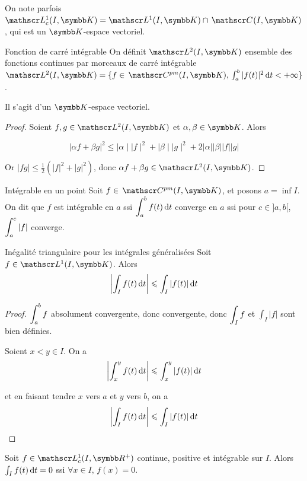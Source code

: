 \begin{remarque}
    On note parfois $\mathscr L^1_c(I, \K) = \mathscr L^1(I, \K) \cap \mc {} (I, \K)$, 
    qui est un $\K$-espace vectoriel.
\end{remarque}

\begin{definition}{Fonction de carré intégrable}{}
    On définit $\mathscr L^2(I, \K)$ ensemble des fonctions continues par morceaux de carré 
    intégrable $\mathscr L^2(I, \K) = \{f \in \mc {pm}(I, \K), \, \int_a^b |f(t)|^2 \dt < + \infty\}$.

    Il s'agit d'un $\K$-espace vectoriel.
\end{definition}

\begin{proof}
    Soient $f, g \in \mathscr L^2(I, \K)$ et $\alpha, \beta \in \K$. Alors

    $$|\alpha f + \beta g|^2 \leqslant \mid \alpha \mid \mid f \mid ^2 + \mid \beta \mid \mid g \mid^2 + 2 |\alpha| |\beta| |f| |g| $$

    Or $|fg| \leqslant \frac 1 2 (|f|^2 + |g|^2)$, donc $\alpha f + \beta g \in \mathscr L^2(I, \K)$.
\end{proof}

\begin{definition}{Intégrable en un point}{}
    Soit $f \in \mc {pm}(I, \K)$, et posons $a = \inf I$. On dit que $f$ est intégrable en 
    $a$ ssi $\displaystyle \int_a^b f(t) \,\mathrm{d}t$ converge en $a$ ssi pour $c \in ]a, b[$, $\displaystyle \int_a^c |f|$ converge.
\end{definition}

\begin{theoreme}{Inégalité triangulaire pour les intégrales généralisées}{}
    Soit $f \in \mathscr L^1(I, \K)$. Alors 
    $$\left| \int_I f(t) \,\mathrm{d}t \right| \leqslant \int_I |f(t)| \,\mathrm{d}t$$
\end{theoreme}

\begin{proof}
    $\displaystyle \int_{a }^{b } f$ absolument convergente, donc convergente, donc 
    $\displaystyle \int_I f$ et $\int_I |f|$ sont bien définies.

    \avspace Soient $x < y \in I$. On a 
    $$\left| \int_x^y f(t) \,\mathrm{d}t \right| \leqslant \int_x^y |f(t)| \,\mathrm{d}t$$

    et en faisant tendre $x$ vers $a$ et $y$ vers $b$, on a
    $$\left| \int_I f(t) \,\mathrm{d}t \right| \leqslant \int_I |f(t)| \,\mathrm{d}t$$
\end{proof}


\begin{proposition}{}{}
    Soit $f \in \mathscr L^1_c (I, \R^+)$ continue, positive et intégrable sur $I$. 
    Alors $\int_I f(t) \,\mathrm{d}t =0$ ssi $\forall x \in I, \, f(x) = 0$.
\end{proposition}

